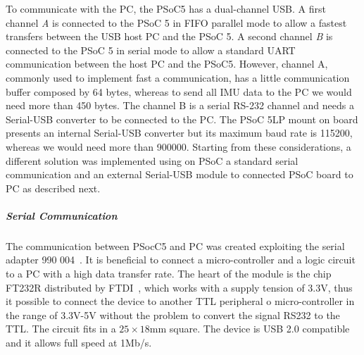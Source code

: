 To communicate with the PC, the PSoC5 has a dual-channel USB. A first channel \textit{A} %
is connected to the PSoC 5 in FIFO parallel mode to allow a fastest transfers between the USB host PC and the PSoC 5. A second channel \textit{B} is connected to the PSoC 5 in serial mode to allow a standard UART communication between the host PC and the PSoC5. However, channel A, commonly used to implement fast a communication, has a little communication buffer composed by 64 bytes, whereas to send all IMU data to the PC we would need more than 450 bytes. The channel B is a serial RS-232 channel and needs a Serial-USB converter to be connected to the PC. The PSoC 5LP mount on board presents an internal Serial-USB converter but its maximum baud rate is 115200, whereas we would need more than 900000.
Starting from these considerations, a different solution was implemented using on PSoC a standard serial communication and an external Serial-USB module to connected PSoC board to PC as described next.

\subparagraph{Serial Communication}

The communication between PSocC5 and PC was created exploiting the serial adapter 990 004~\cite{Serial_USB}. It is beneficial to connect a micro-controller and a logic circuit to a PC with a high data transfer rate. The heart of the module is the chip FT232R distributed by FTDI~\cite{FDTI_homepage}, which works with a supply tension of 3.3V, thus it possible to connect the device to another TTL peripheral o micro-controller in the range of 3.3V-5V without the problem to convert the signal RS232 to the TTL. The circuit fits in a $25 \times 18$mm square. The device is USB 2.0 compatible and it allows full speed at 1Mb/s.


